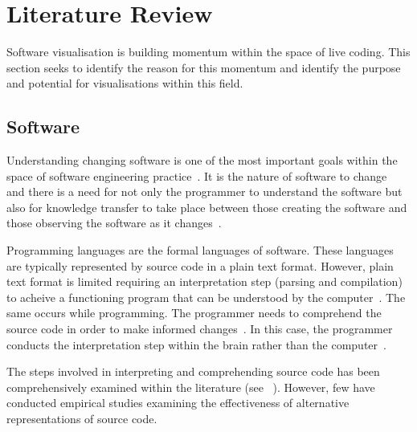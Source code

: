 
\chapter{Literature Review}


Software visualisation is building momentum within the space of live coding. This section seeks to identify the reason for this momentum and identify the purpose and potential for visualisations within this field.


\section{Software}

Understanding changing software is one of the most important goals within the space of software engineering practice~\cite{Tao2012}. It is the nature of software to change~\cite{Purushothaman2005} and there is a need for not only the programmer to understand the software but also for knowledge transfer to take place between those creating the software and those observing the software as it changes~.

Programming languages are the formal languages of software. These languages are typically represented by source code in a plain text format. However, plain text format is limited requiring an interpretation step (parsing and compilation) to acheive a functioning program that can be understood by the computer~\cite{Badros2000}. The same occurs while programming. The programmer needs to comprehend the source code in order to make informed changes~. In this case, the programmer conducts the interpretation step within the brain rather than the computer~.

The steps involved in interpreting and comprehending source code has been comprehensively examined within the literature (see ~\cite{Novais2013,McLean2010a,Brooks1995,Desmond,Rajlich2002}). However, few have conducted empirical studies examining the effectiveness of alternative representations of source code.

